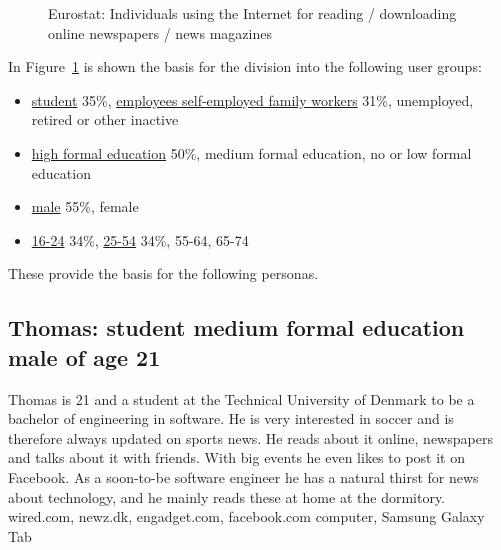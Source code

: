 \begin{figure}[h!tp]
{  %
} \qquad
{}
\caption{Eurostat: Individuals using the Internet for reading / downloading online newspapers / news magazines}
	\label{fig:charts-usergroups}
\end{figure}

In Figure~\ref{fig:charts-usergroups} is shown the basis for the division into the following user groups:
\begin{itemize}
	\item \url{student} 35\%, \url{employees self-employed family workers} 31\%, unemployed, retired or other inactive
	\item \url{high formal education} 50\%, medium formal education, no or low formal education
	\item \url{male} 55\%, female
	\item \url{16-24} 34\%, \url{25-54} 34\%, 55-64, 65-74
\end{itemize}

These provide the basis for the following personas.

\subsection{Thomas: student medium formal education male of age 21}
Thomas is 21 and a student at the Technical University of Denmark to be a bachelor of engineering in software. He is very interested in soccer and is therefore always updated on sports news. He reads about it online, newspapers and talks about it with friends. With big events he even likes to post it on Facebook. As a soon-to-be software engineer he has a natural thirst for news about technology, and he mainly reads these at home at the dormitory.
wired.com, newz.dk, engadget.com, facebook.com
computer, Samsung Galaxy Tab

